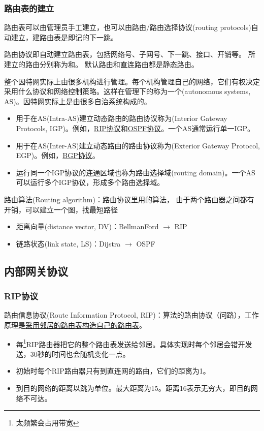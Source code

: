 \subsubsection{路由表的建立}
路由表可以由管理员手工建立，也可以由路由/路由选择协议(routing protocols)自动建立，建路由表是即记的下一跳。

路由协议即自动建立路由表，包括网络号、子网号、下一跳、接口、开销等。
所建立的路由分别称为和。
默认路由和直连路由都是静态路由。

整个因特网实际上由很多机构进行管理。每个机构管理自己的网络，它们有权决定采用什么协议和网络控制策略。这样在管理下的称为一个(autonomous systems, AS)。因特网实际上是由很多自治系统构成的。
\begin{itemize}
	\item 用于在AS(Intra-AS)建立动态路由的路由协议称为(Interior Gateway Protocols, IGP)。例如，\underline{RIP协议}和\underline{OSPF协议}。一个AS通常运行单一IGP。
	\item 用于在AS(Inter-AS)建立动态路由的路由协议称为(Exterior Gateway Protocol, EGP)。例如，\underline{BGP协议}。
	\item 运行同一个IGP协议的连通区域也称为路由选择域(routing domain)。一个AS可以运行多个IGP协议，形成多个路由选择域。
\end{itemize}

路由算法(Routing algorithm)：路由协议里用的算法， 由于两个路由器之间都有开销，可以建立一个图，找最短路径
\begin{itemize}
	\item 距离向量(distance vector, DV)：BellmanFord $\to$ RIP
	\item 链路状态(link state, LS)：Dijstra $\to$ OSPF
\end{itemize}

\subsection{内部网关协议}
\subsubsection{RIP协议}
路由信息协议(Route Information Protocol, RIP)：算法的路由协议（问路），工作原理是\underline{采用邻居的路由表构造自己的路由表}。
\begin{itemize}
	\item 每\footnote{太频繁会占用带宽}RIP路由器把它的整个路由表发送给邻居。具体实现时每个邻居会错开发送，30秒的时间也会随机变化一点。
	\item 初始时每个RIP路由器只有到直连网的路由，它们的距离为1。
	\item 到目的网络的距离以跳为单位。最大距离为15。距离16表示无穷大，即目的网络不可达。
\end{itemize}

